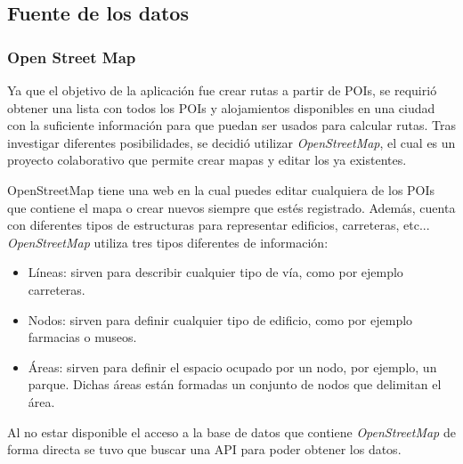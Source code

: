 \subsection[Fuente de los datos]{Fuente de los datos}
\subsubsection[OSM]{Open Street Map}
Ya que el objetivo de la aplicación fue crear rutas a partir de POIs, se requirió obtener una lista con todos los POIs y alojamientos disponibles en una ciudad con la suficiente información para que puedan ser usados para calcular rutas.\newline
Tras investigar diferentes posibilidades, se decidió utilizar \textit{OpenStreetMap}, el cual es un proyecto colaborativo que permite crear mapas y editar los ya existentes.\newline

OpenStreetMap tiene una web \cite{openstreetmap} en la cual puedes editar cualquiera de los POIs que contiene el mapa o crear nuevos siempre que estés registrado. Además, cuenta con diferentes tipos de estructuras para representar edificios, carreteras, etc... \textit{OpenStreetMap} utiliza tres tipos diferentes de información:\newline
\begin{itemize}
	\item Líneas: sirven para describir cualquier tipo de vía, como por ejemplo carreteras.
	\item Nodos: sirven para definir cualquier tipo de edificio, como por ejemplo farmacias o museos.
	\item Áreas: sirven para definir el espacio ocupado por un nodo, por ejemplo, un parque. Dichas áreas están formadas un conjunto de nodos que delimitan el área.
\end{itemize}
Al no estar disponible el acceso a la base de datos que contiene \textit{OpenStreetMap} de forma directa se tuvo que buscar una API para poder obtener los datos.
